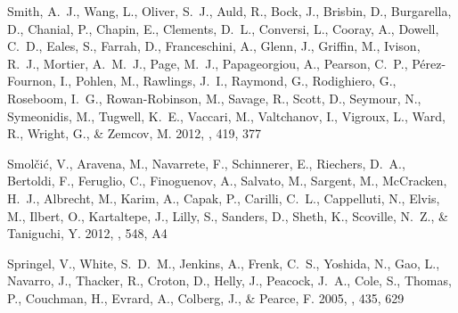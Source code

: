 \documentclass[iop]{emulateapj}
\begin{document}
\begin{thebibliography}{106}
{Smith}, A.~J., {Wang}, L., {Oliver}, S.~J., {Auld}, R., {Bock}, J., {Brisbin},
  D., {Burgarella}, D., {Chanial}, P., {Chapin}, E., {Clements}, D.~L.,
  {Conversi}, L., {Cooray}, A., {Dowell}, C.~D., {Eales}, S., {Farrah}, D.,
  {Franceschini}, A., {Glenn}, J., {Griffin}, M., {Ivison}, R.~J., {Mortier},
  A.~M.~J., {Page}, M.~J., {Papageorgiou}, A., {Pearson}, C.~P.,
  {P{\'e}rez-Fournon}, I., {Pohlen}, M., {Rawlings}, J.~I., {Raymond}, G.,
  {Rodighiero}, G., {Roseboom}, I.~G., {Rowan-Robinson}, M., {Savage}, R.,
  {Scott}, D., {Seymour}, N., {Symeonidis}, M., {Tugwell}, K.~E., {Vaccari},
  M., {Valtchanov}, I., {Vigroux}, L., {Ward}, R., {Wright}, G., \& {Zemcov},
  M. 2012, \mnras, 419, 377

{Smol{\v c}i{\'c}}, V., {Aravena}, M., {Navarrete}, F., {Schinnerer}, E.,
  {Riechers}, D.~A., {Bertoldi}, F., {Feruglio}, C., {Finoguenov}, A.,
  {Salvato}, M., {Sargent}, M., {McCracken}, H.~J., {Albrecht}, M., {Karim},
  A., {Capak}, P., {Carilli}, C.~L., {Cappelluti}, N., {Elvis}, M., {Ilbert},
  O., {Kartaltepe}, J., {Lilly}, S., {Sanders}, D., {Sheth}, K., {Scoville},
  N.~Z., \& {Taniguchi}, Y. 2012, \aap, 548, A4

{Springel}, V., {White}, S.~D.~M., {Jenkins}, A., {Frenk}, C.~S., {Yoshida},
  N., {Gao}, L., {Navarro}, J., {Thacker}, R., {Croton}, D., {Helly}, J.,
  {Peacock}, J.~A., {Cole}, S., {Thomas}, P., {Couchman}, H., {Evrard}, A.,
  {Colberg}, J., \& {Pearce}, F. 2005, \nat, 435, 629


\end{thebibliography}
\end{document}

